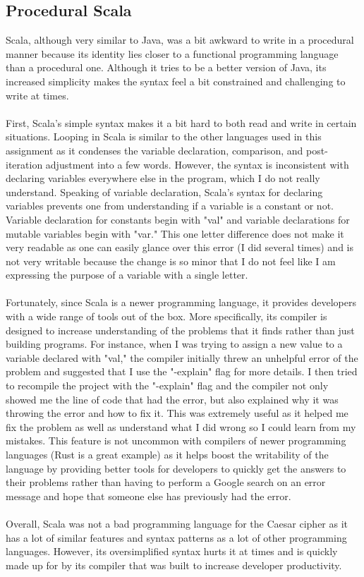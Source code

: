 \documentclass[letterpaper, 10pt, DIV=13]{scrartcl}
\numberwithin{equation}{section}
\numberwithin{figure}{section}
\numberwithin{table}{section}
\begin{document}
\subsection{Procedural Scala}
Scala, although very similar to Java, was a bit awkward to write in a procedural manner because its identity lies closer to a functional programming language than a procedural one. Although it tries to be a better version of Java, its increased simplicity makes the syntax feel a bit constrained and challenging to write at times.
\\ \\
First, Scala's simple syntax makes it a bit hard to both read and write in certain situations. Looping in Scala is similar to the other languages used in this assignment as it condenses the variable declaration, comparison, and post-iteration adjustment into a few words. However, the syntax is inconsistent with declaring variables everywhere else in the program, which I do not really understand. Speaking of variable declaration, Scala's syntax for declaring variables prevents one from understanding if a variable is a constant or not. Variable declaration for constants begin with "val" and variable declarations for mutable variables begin with "var." This one letter difference does not make it very readable as one can easily glance over this error (I did several times) and is not very writable because the change is so minor that I do not feel like I am expressing the purpose of a variable with a single letter.
\\ \\
Fortunately, since Scala is a newer programming language, it provides developers with a wide range of tools out of the box. More specifically, its compiler is designed to increase understanding of the problems that it finds rather than just building programs. For instance, when I was trying to assign a new value to a variable declared with "val," the compiler initially threw an unhelpful error of the problem and suggested that I use the "-explain" flag for more details. I then tried to recompile the project with the "-explain" flag and the compiler not only showed me the line of code that had the error, but also explained why it was throwing the error and how to fix it. This was extremely useful as it helped me fix the problem as well as understand what I did wrong so I could learn from my mistakes. This feature is not uncommon with compilers of newer programming languages (Rust is a great example) as it helps boost the writability of the language by providing better tools for developers to quickly get the answers to their problems rather than having to perform a Google search on an error message and hope that someone else has previously had the error.
\\ \\
Overall, Scala was not a bad programming language for the Caesar cipher as it has a lot of similar features and syntax patterns as a lot of other programming languages. However, its oversimplified syntax hurts it at times and is quickly made up for by its compiler that was built to increase developer productivity.
\end{document}

